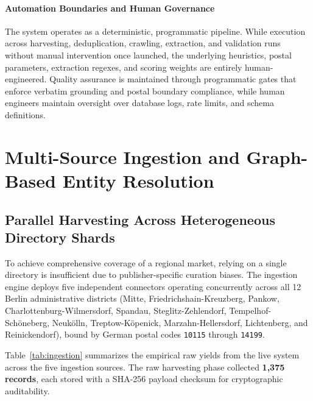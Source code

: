 \documentclass[11pt,a4paper]{article}
\begin{document}
\paragraph{Automation Boundaries and Human Governance} The system operates as a deterministic, programmatic pipeline. While execution across harvesting, deduplication, crawling, extraction, and validation runs without manual intervention once launched, the underlying heuristics, postal parameters, extraction regexes, and scoring weights are entirely human-engineered. Quality assurance is maintained through programmatic gates that enforce verbatim grounding and postal boundary compliance, while human engineers maintain oversight over database logs, rate limits, and schema definitions.

\section{Multi-Source Ingestion and Graph-Based Entity Resolution}

\subsection{Parallel Harvesting Across Heterogeneous Directory Shards}
To achieve comprehensive coverage of a regional market, relying on a single directory is insufficient due to publisher-specific curation biases. The ingestion engine deploys five independent connectors operating concurrently across all 12 Berlin administrative districts (Mitte, Friedrichshain-Kreuzberg, Pankow, Charlottenburg-Wilmersdorf, Spandau, Steglitz-Zehlendorf, Tempelhof-Sch\"oneberg, Neuk\"olln, Treptow-K\"openick, Marzahn-Hellersdorf, Lichtenberg, and Reinickendorf), bound by German postal codes \texttt{10115} through \texttt{14199}.

Table~\ref{tab:ingestion} summarizes the empirical raw yields from the live system across the five ingestion sources. The raw harvesting phase collected \textbf{1,375 records}, each stored with a SHA-256 payload checksum for cryptographic auditability.
\end{document}
